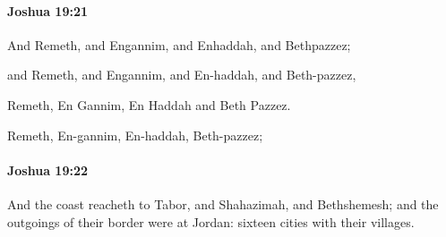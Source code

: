 		\paragraph{Joshua 19:21} %
			\label{JOSHUA-19-21}

			And Remeth, and Engannim, and Enhaddah, and Bethpazzez;

			\begin{versebox}
					\item[BHS] 
					\item[ASV] and Remeth, and Engannim, and En-haddah, and Beth-pazzez,
					\item[NIV] Remeth, En Gannim, En Haddah and Beth Pazzez.
					\item[NRSV] Remeth, En-gannim, En-haddah, Beth-pazzez;
			\end{versebox}

		\paragraph{Joshua 19:22} %
			\label{JOSHUA-19-22}

			And the coast reacheth to Tabor, and Shahazimah, and Bethshemesh; and the outgoings of their border were at Jordan: sixteen cities with their villages.

